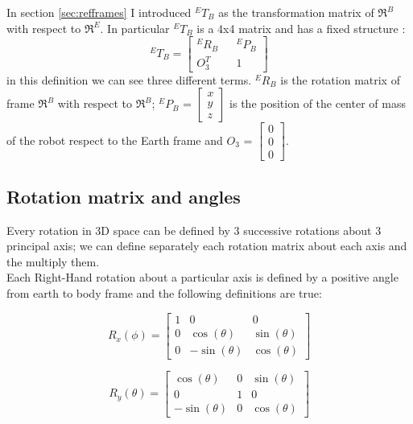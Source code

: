 \noindent
In section \ref{sec:refframes} I introduced ${}^ET_B$ as the transformation matrix of $\Re^B$ with respect to $\Re^E$. In particular ${}^ET_B$ is a 4x4 matrix and has a fixed structure \cite{Khalil2004}: \begin{equation}
{}^ET_B = \begin{bmatrix}
{}^ER_B&&{}^EP_B\\
O_3^T&&1
\end{bmatrix}
\label{eq:transdef}
\end{equation}
in this definition we can see three different terms. ${}^ER_B$ is the rotation matrix of frame $\Re^B$ with respect to $\Re^B$; ${}^EP_B$ = $\begin{bmatrix}x\\y\\z\end{bmatrix}$ is the position of the center of mass of the robot respect to the Earth frame and $O_3$ = $\begin{bmatrix}0\\0\\0\end{bmatrix}$. 

\subsection*{Rotation matrix and angles}

Every rotation in 3D space can be defined by 3 successive rotations about 3 principal axis; we can define separately each rotation matrix about each axis and the multiply them.\\ 

\noindent
Each Right-Hand rotation about a particular axis is defined by a positive angle \cite{Blanco2010} from earth to body frame and the following definitions are true:

\begin{equation}
R_x(\phi) = \begin{bmatrix} 1 & 0            & 0 \\
							  0 & \cos(\theta) & \sin(\theta)\\
                              0 & -\sin(\theta) &  \cos(\theta) 
\end{bmatrix}
\end{equation}

\begin{equation}
R_y(\theta) = \begin{bmatrix} \cos(\theta)  & 0 & \sin(\theta) \\
							  0 & 		      1 &   0\\
                              -\sin(\theta) &  0 &  \cos(\theta) 
\end{bmatrix}
\end{equation}

